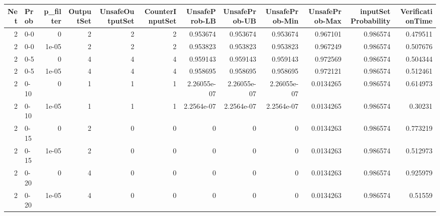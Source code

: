 \begin{tabular}{rlrrrrrrrrrr}
\hline
   Net & Prob   &   p\_filter &   OutputSet &   UnsafeOutputSet &   CounterInputSet &   UnsafeProb-LB &   UnsafeProb-UB &   UnsafeProb-Min &   UnsafeProb-Max &   inputSet Probability &   VerificationTime \\
\hline
     2 & 0-0    &      0     &           2 &                 2 &                 2 &     0.953674    &     0.953674    &      0.953674    &        0.967101  &               0.986574 &           0.479511 \\
     2 & 0-0    &      1e-05 &           2 &                 2 &                 2 &     0.953823    &     0.953823    &      0.953823    &        0.967249  &               0.986574 &           0.507676 \\
     2 & 0-5    &      0     &           4 &                 4 &                 4 &     0.959143    &     0.959143    &      0.959143    &        0.972569  &               0.986574 &           0.504344 \\
     2 & 0-5    &      1e-05 &           4 &                 4 &                 4 &     0.958695    &     0.958695    &      0.958695    &        0.972121  &               0.986574 &           0.512461 \\
     2 & 0-10   &      0     &           1 &                 1 &                 1 &     2.26055e-07 &     2.26055e-07 &      2.26055e-07 &        0.0134265 &               0.986574 &           0.614973 \\
     2 & 0-10   &      1e-05 &           1 &                 1 &                 1 &     2.2564e-07  &     2.2564e-07  &      2.2564e-07  &        0.0134265 &               0.986574 &           0.30231  \\
     2 & 0-15   &      0     &           2 &                 0 &                 0 &     0           &     0           &      0           &        0.0134263 &               0.986574 &           0.773219 \\
     2 & 0-15   &      1e-05 &           2 &                 0 &                 0 &     0           &     0           &      0           &        0.0134263 &               0.986574 &           0.512973 \\
     2 & 0-20   &      0     &           4 &                 0 &                 0 &     0           &     0           &      0           &        0.0134263 &               0.986574 &           0.925979 \\
     2 & 0-20   &      1e-05 &           4 &                 0 &                 0 &     0           &     0           &      0           &        0.0134263 &               0.986574 &           0.51559  \\

\end{tabular}
